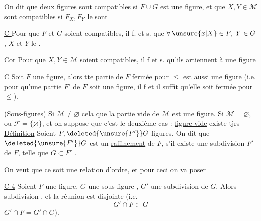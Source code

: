 On dit que deux figures  \uline{sont compatibles} si $F\cup G$ est une figure, et que $X,Y\in\mathcal M$ sont \uline{compatibles} si $F_X,F_Y$ le sont

\uline{C } Pour que $F$ et $G$ soient compatibles, il f. et s. que $\forall\,\unsure{x|X}\in F,\ Y\in G$, $X$ et $Y$ le .

\uline{Cor}  Pour que $X,Y\in\mathcal M$ soient compatibles, il f et s. qu'ils artiennent à une figure


\uline{C } Soit $F$ une figure, alors tte partie de $F$ fermée pour $\leq$ est aussi une figure (i.e. pour qu'une partie $F'$ de $F$ soit une figure, il f et il \uline{suffit} qu'elle soit fermée pour $\leq$).

(\uline{Sous-figures}) Si $\mathcal M\ne\varnothing$ cela   que la partie vide de $\mathcal M$ est une figure. Si $\mathcal M=\varnothing$,    ou $\mathcal F=\{\varnothing\}$, et on suppose que c'est le deuxième cas : \uline{figure vide} existe tjrs
\uline{Définition} Soient $F,\deleted{\unsure{F'}}G$  figures. On dit que $\deleted{\unsure{F'}}G$ est un \uline{raffinement} de $F$, s'il existe une  subdivision $F'$ de $F$, telle que $G\subset F'$ .

On veut que ce soit une relation d'ordre, et pour ceci on va poser

\uline{C 4} Soient $F$ une figure, $G$ une sous-figure , $G'$ une subdivision de $G$. Alors   subdivision , et la réunion est disjointe (i.e.  %
\[
 \boxed{G'\cap F\subset G}
\]
 $G'\cap F=G'\cap G$).

